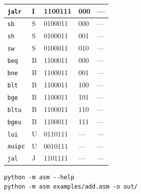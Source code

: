 {\begin{longtable}{@{}lllll@{}}
  \texttt{jalr}    & I & 1100111 & 000 & --- \\
  \midrule
  \texttt{sb}      & S & 0100011 & 000 & --- \\
  \texttt{sh}      & S & 0100011 & 001 & --- \\
  \texttt{sw}      & S & 0100011 & 010 & --- \\
  \midrule
  \texttt{beq}     & B & 1100011 & 000 & --- \\
  \texttt{bne}     & B & 1100011 & 001 & --- \\
  \texttt{blt}     & B & 1100011 & 100 & --- \\
  \texttt{bge}     & B & 1100011 & 101 & --- \\
  \texttt{bltu}    & B & 1100011 & 110 & --- \\
  \texttt{bgeu}    & B & 1100011 & 111 & --- \\
  \midrule
  \texttt{lui}     & U & 0110111 & --- & --- \\
  \texttt{auipc}   & U & 0010111 & --- & --- \\
  \midrule
  \texttt{jal}     & J & 1101111 & --- & --- \\
  \bottomrule
\end{longtable}
}

\label{sec:prilog-uputstvo}

\begin{lstlisting}[caption={Osnovno korišćenje asemblera}]
python -m asm --help
python -m asm examples/add.asm -o out/
\end{lstlisting}
